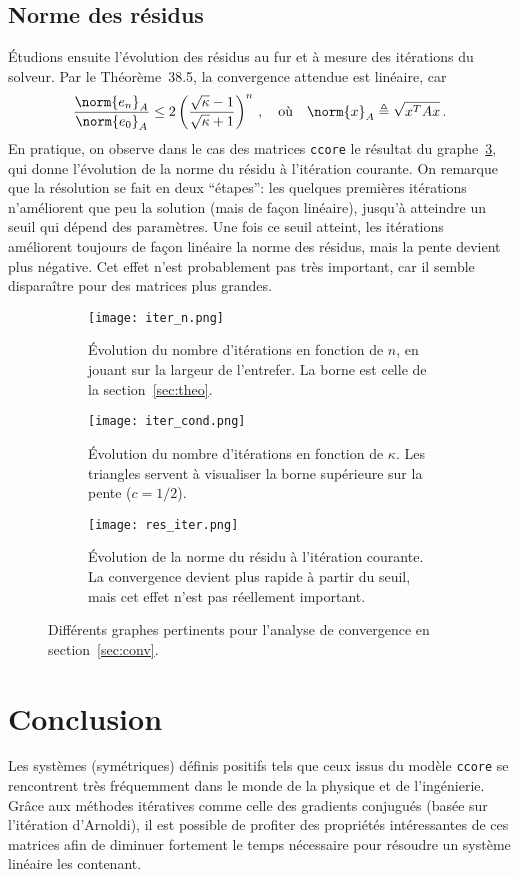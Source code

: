 \documentclass[11pt]{article}
\begin{document}
\subsection{Norme des résidus}
Étudions ensuite l'évolution des résidus au fur et à mesure des itérations du solveur. Par le Théorème~38.5, la convergence attendue est linéaire, car
\[
\frac{\norm{e_n}_A}{\norm{e_0}_A} \le 2 \left(\frac{\sqrt{\kappa}-1}{\sqrt{\kappa}+1}\right)^n\,, \quad \textnormal{où} \quad \norm{x}_{A} \triangleq \sqrt{x^T A x}\,.
\]
En pratique, on observe dans le cas des matrices \texttt{ccore} le résultat du graphe~\ref{fig:res_iter}, qui donne l'évolution de la norme du résidu à l'itération courante. On remarque que la résolution se fait en deux \foreignquote{french}{étapes}: les quelques premières itérations n'améliorent que peu la solution (mais de façon linéaire), jusqu'à atteindre un seuil qui dépend des paramètres. Une fois ce seuil atteint, les itérations améliorent toujours de façon linéaire la norme des résidus, mais la pente devient plus négative. Cet effet n'est probablement pas très important, car il semble disparaître pour des matrices plus grandes.

\begin{figure}[H]
	\centering
	\begin{subfigure}[t]{0.3\textwidth}
		\centering
		\texttt{[image: iter\_n.png]}
		\caption{Évolution du nombre d'itérations en fonction de $n$, en jouant sur la largeur de l'entrefer. La borne est celle de la section~\ref{sec:theo}.}
		\label{fig:iter_n}
	\end{subfigure}\hfill
	\begin{subfigure}[t]{0.3\textwidth}
		\centering
		\texttt{[image: iter\_cond.png]}
		\caption{Évolution du nombre d'itérations en fonction de $\kappa$. Les triangles servent à visualiser la borne supérieure sur la pente ($c = 1/2$).}
		\label{fig:iter_cond}
	\end{subfigure}\hfill
	\begin{subfigure}[t]{0.3\textwidth}
		\centering
		\texttt{[image: res\_iter.png]}
		\caption{Évolution de la norme du résidu à l'itération courante. La convergence devient plus rapide à partir du seuil, mais cet effet n'est pas réellement important.}
		\label{fig:res_iter}
	\end{subfigure}
	\caption{Différents graphes pertinents pour l'analyse de convergence en section~\ref{sec:conv}.}
	\label{fig:conv_anal}
\end{figure}
\section*{Conclusion}
Les systèmes (symétriques) définis positifs tels que ceux issus du modèle \texttt{ccore} se rencontrent très fréquemment dans le monde de la physique et de l'ingénierie. Grâce aux méthodes itératives comme celle des gradients conjugués (basée sur l'itération d'Arnoldi), il est possible de profiter des propriétés intéressantes de ces matrices afin de diminuer fortement le temps nécessaire pour résoudre un système linéaire les contenant.
\end{document}
